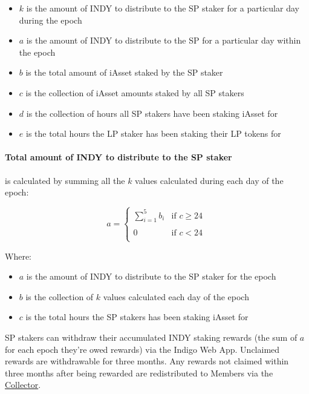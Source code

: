 \documentclass{article}
\begin{document}
\begin{sloppypar}
\begin{itemize}
\item
  \(k\) is the amount of INDY to distribute to the SP staker for a
  particular day during the epoch
\item
  \(a\) is the amount of INDY to distribute to the SP for a particular
  day within the epoch
\item
  \(b\) is the total amount of iAsset staked by the SP staker
\item
  \(c\) is the collection of iAsset amounts staked by all SP stakers
\item
  \(d\) is the collection of hours all SP stakers have been staking
  iAsset for
\item
  \(e\) is the total hours the LP staker has been staking their LP
  tokens for
\end{itemize}

\hypertarget{total-amount-of-indy-to-distribute-to-the-sp-staker}{%
\paragraph{Total amount of INDY to distribute to the SP
staker}\label{total-amount-of-indy-to-distribute-to-the-sp-staker}}

is calculated by summing all the \(k\) values calculated during each day
of the epoch:

\[a = \left\{ \begin{matrix}
  \sum_{i = 1}^{5}b_{i} & \text{if\ }c \geq 24 \\ \\
  0 & \text{if\ }c < 24 \\
  \end{matrix} \right.\ \]

Where:

\begin{itemize}
\item
  \(a\) is the amount of INDY to distribute to the SP staker for the
  epoch
\item
  \(b\) is the collection of \(k\) values calculated each day of the
  epoch
\item
  \(c\) is the total hours the SP stakers has been staking iAsset for
\end{itemize}

SP stakers can withdraw their accumulated INDY staking rewards (the sum
of \(a\) for each epoch they're owed rewards) via the Indigo Web App.
Unclaimed rewards are withdrawable for three months. Any rewards not
claimed within three months after being rewarded are redistributed to
Members via the \protect\hyperlink{protocol-profit-sharing}{Collector}.


\end{sloppypar}
\end{document}
